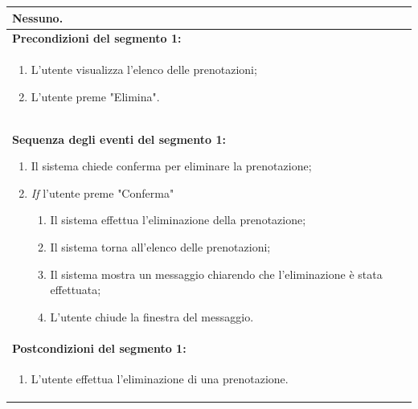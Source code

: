 \documentclass{article}
\begin{document}
\begin{table}[t]
\begin{tabular}{|p{\linewidth}|}
                        Nessuno. \\
                        \hline
                        \cellcolor{gray!20}
                        \textbf{Precondizioni del segmento 1:} \\
                        \cellcolor{gray!20}
                        \begin{minipage}{\linewidth}
                            \begin{enumerate}[noitemsep]
                                \item L'utente visualizza l'elenco delle prenotazioni;
                                \item L'utente preme "Elimina".
                            \end{enumerate}
                        \end{minipage}
                        \vspace{-5pt} \\
                        \hline
                        \textbf{Sequenza degli eventi del segmento 1:}
                        \begin{enumerate}
                            \item Il sistema chiede conferma per eliminare la prenotazione;
                            \item \textit{If} l'utente preme "Conferma"
                            \begin{enumerate}
                                \item Il sistema effettua l'eliminazione della prenotazione;
                                \item Il sistema torna all'elenco delle prenotazioni;
                                \item Il sistema mostra un messaggio chiarendo che l'eliminazione è stata effettuata;
                                \item L'utente chiude la finestra del messaggio.
                            \end{enumerate}
                        \end{enumerate} \\
                        \hline
                        \cellcolor{gray!20}
                        \textbf{Postcondizioni del segmento 1:} \\
                        \cellcolor{gray!20}
                        \begin{minipage}{\linewidth}
                            \begin{enumerate}[noitemsep]
                                \item L'utente effettua l'eliminazione di una prenotazione.
                            \end{enumerate}
                        \end{minipage} \\
                        \hline
                    \end{tabular}
                \end{table}
\end{document}
